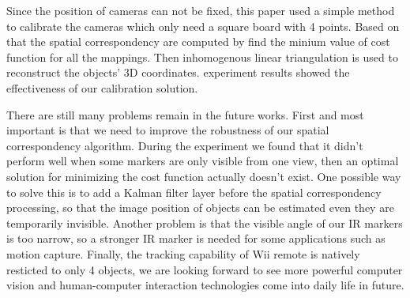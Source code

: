 \documentclass[10pt,twocolumn,letterpaper]{article}
\begin{document}
Since the position of cameras can not be fixed, 
this paper used a simple method to calibrate the cameras which only need a square
board with 4 points. Based on that the spatial correspondency are computed
by find the minium value of cost function for all the mappings. Then 
inhomogenous linear triangulation is used to reconstruct the objects' 3D 
coordinates.
experiment results showed the effectiveness of our calibration
solution.

There are still many problems remain in the future works. 
First and most important is that we need to improve the robustness of our 
spatial correspondency algorithm. During the experiment we found that it 
didn't perform well when some markers are only visible from one view,
then an optimal solution for minimizing the cost function actually doesn't exist.
One possible way to solve this is to add a Kalman filter layer before the spatial 
correspondency processing, so that the image position of objects can be estimated
even they are temporarily invisible. Another problem is that the visible angle
of our IR markers is too narrow, so a stronger IR marker is needed 
for some applications such as motion capture. Finally, the tracking 
capability of Wii remote is natively resticted to only 4 objects, we are 
looking forward to see more powerful computer vision and human-computer
interaction technologies come into daily life in future.

{\small


}

\end{document}
